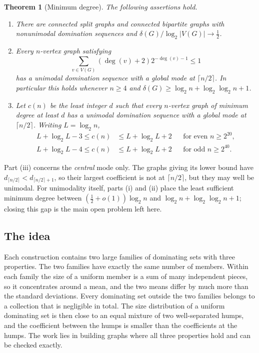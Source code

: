 \documentclass[11pt,a4paper]{article}
\newtheorem{theorem}{Theorem}[section]
\theoremstyle{definition}
\theoremstyle{remark}
\begin{document}
\begin{theorem}[Minimum degree]\label{thm:degree-summary}
The following assertions hold.
\begin{enumerate}[label=(\roman*)]
\item There are connected split graphs and connected bipartite graphs with nonunimodal domination sequences and $\delta(G)/\log_2|V(G)|\to\tfrac12$.
\item Every $n$-vertex graph satisfying
\[
\sum_{v\in V(G)}(\deg(v)+2)2^{-\deg(v)-1}\le1
\]
has a unimodal domination sequence with a global mode at $\lceil n/2\rceil$. In particular this holds whenever $n\ge4$ and $\delta(G)\ge\log_2n+\log_2\log_2n+1$.
\item Let $c(n)$ be the least integer $d$ such that every $n$-vertex graph of minimum degree at least $d$ has a unimodal domination sequence with a global mode at $\lceil n/2\rceil$. Writing $L=\log_2 n$,
\begin{align*}
L+\log_2L-3\le c(n)&\le L+\log_2 L+2&&\text{for even }n\ge2^{20},\\
L+\log_2L-4\le c(n)&\le L+\log_2 L+2&&\text{for odd }n\ge2^{40}.
\end{align*}
\end{enumerate}
\end{theorem}
Part (iii) concerns the \emph{central} mode only. The graphs giving its lower bound have $d_{\lceil n/2\rceil}<d_{\lceil n/2\rceil+1}$, so their largest coefficient is not at $\lceil n/2\rceil$, but they may well be unimodal. For unimodality itself, parts (i) and (ii) place the least sufficient minimum degree between $(\tfrac12+o(1))\log_2n$ and $\log_2 n+\log_2\log_2 n+1$; closing this gap is the main open problem left here.

\subsection{The idea}
Each construction contains two large families of dominating sets with three properties. The two families have exactly the same number of members. Within each family the size of a uniform member is a sum of many independent pieces, so it concentrates around a mean, and the two means differ by much more than the standard deviations. Every dominating set outside the two families belongs to a collection that is negligible in total. The size distribution of a uniform dominating set is then close to an equal mixture of two well-separated humps, and the coefficient between the humps is smaller than the coefficients at the humps. The work lies in building graphs where all three properties hold and can be checked exactly.
\end{document}
